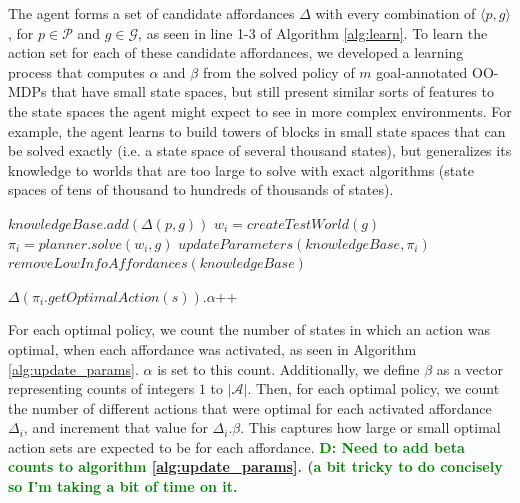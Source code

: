 \documentclass[conference]{IEEEtran}
\newcommand{\dnote}[1]{\textcolor{Green}{\textbf{D: #1}}}
\begin{document}
The agent forms a set of candidate affordances $\Delta$ with every
combination of $\langle p, g \rangle$, for $p \in \mathcal{P}$ and $g
\in \mathcal{G}$, as seen in line 1-3 of Algorithm \ref{alg:learn}. To learn the action set for each of these candidate
affordances, we developed a learning process that computes
$\alpha$ and $\beta$ from the solved policy of $m$ goal-annotated
OO-MDPs that have small state spaces, but still present similar sorts
of features to the state spaces the agent might expect to see in more
complex environments. For example, the agent learns to build towers
of blocks in small state spaces that can be solved exactly (i.e. a state space of several thousand states), but
generalizes its knowledge to worlds that are too large to
solve with exact algorithms (state spaces of tens of thousand to hundreds of thousands of states).

\begin{algorithm}
  \caption{$learn(\mathcal{P}, \mathcal{G})$}
  \begin{algorithmic}[1]
    \State $knowledgeBase.add(\Delta(p,g))$
    \EndFor
    \State $w_i = createTestWorld(g)$
    \State $\pi_i = planner.solve(w_i, g)$
    \State $updateParameters(knowledgeBase, \pi_i)$
    \EndFor
    \State $removeLowInfoAffordances(knowledgeBase)$
  \end{algorithmic}
  \label{alg:learn}
\end{algorithm}

\begin{algorithm}
  \caption{$updateParameters(knowledgeBase, \pi)$}
  \begin{algorithmic}[1]
    \State $\Delta(\pi_i.getOptimalAction(s)).\alpha$++
    \EndIf
    \EndFor
    \EndFor
  \end{algorithmic}
  \label{alg:update_params}
\end{algorithm}

For each optimal policy, we count the number of states in which an action was optimal,
when each affordance was activated, as seen in Algorithm \ref{alg:update_params}. $\alpha$ is set to
this count. Additionally, we define $\beta$ as a vector representing counts of
integers $1$ to $|\mathcal{A}|$.  Then, for each optimal policy, we
count the number of different actions that were optimal for each
activated affordance $\Delta_i$, and increment that value for
$\Delta_i.\beta$. This captures how large or small optimal action sets
are expected to be for each affordance. \dnote{Need to add beta 
counts to algorithm \ref{alg:update_params}. (a bit tricky to do concisely so I'm taking a bit of time on it.}
\end{document}
